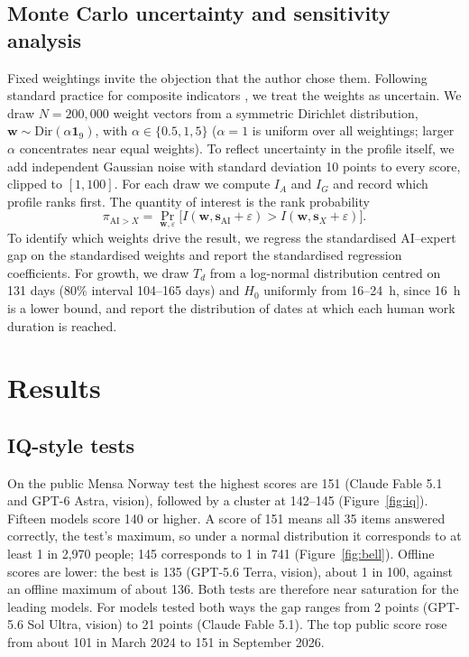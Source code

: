 \documentclass[11pt]{article}
\begin{document}
\subsection{Monte Carlo uncertainty and sensitivity analysis}
Fixed weightings invite the objection that the author chose them. Following standard practice for composite indicators \citep{saisana2005,saltelli2008}, we treat the weights as uncertain. We draw $N=200{,}000$ weight vectors from a symmetric Dirichlet distribution, $\mathbf{w}\sim\mathrm{Dir}(\alpha\mathbf{1}_9)$, with $\alpha\in\{0.5,1,5\}$ ($\alpha=1$ is uniform over all weightings; larger $\alpha$ concentrates near equal weights). To reflect uncertainty in the profile itself, we add independent Gaussian noise with standard deviation 10 points to every score, clipped to $[1,100]$. For each draw we compute $I_A$ and $I_G$ and record which profile ranks first. The quantity of interest is the rank probability
\begin{equation}
\pi_{\text{AI}>X}=\Pr_{\mathbf{w},\varepsilon}\big[I(\mathbf{w},\mathbf{s}_{\text{AI}}+\varepsilon)>I(\mathbf{w},\mathbf{s}_X+\varepsilon)\big].
\end{equation}
To identify which weights drive the result, we regress the standardised AI--expert gap on the standardised weights and report the standardised regression coefficients. For growth, we draw $T_d$ from a log-normal distribution centred on 131 days (80\% interval 104--165 days) and $H_0$ uniformly from 16--24~h, since 16~h is a lower bound, and report the distribution of dates at which each human work duration is reached.

\section{Results}
\subsection{IQ-style tests}
On the public Mensa Norway test the highest scores are 151 (Claude Fable 5.1 and GPT-6 Astra, vision), followed by a cluster at 142--145 (Figure~\ref{fig:iq}). Fifteen models score 140 or higher. A score of 151 means all 35 items answered correctly, the test's maximum, so under a normal distribution it corresponds to at least 1 in 2,970 people; 145 corresponds to 1 in 741 (Figure~\ref{fig:bell}). Offline scores are lower: the best is 135 (GPT-5.6 Terra, vision), about 1 in 100, against an offline maximum of about 136. Both tests are therefore near saturation for the leading models. For models tested both ways the gap ranges from 2 points (GPT-5.6 Sol Ultra, vision) to 21 points (Claude Fable 5.1). The top public score rose from about 101 in March 2024 to 151 in September 2026.
\end{document}
